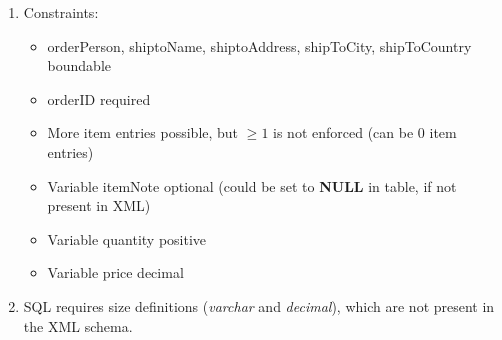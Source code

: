 \documentclass{scrartcl}
\begin{document}
\begin{enumerate}
		\item
		Constraints:
		\begin{itemize}
			\item orderPerson, shiptoName, shiptoAddress, shipToCity, shipToCountry boundable \checkmark
			\item orderID required \checkmark
			\item More item entries possible, but $\geq1$ is not enforced (can be 0 item entries) \lightning
			\item Variable itemNote optional (could be set to \textbf{NULL} in table, if not present in XML) \checkmark
			\item Variable quantity positive \checkmark
			\item Variable price decimal \checkmark
		\end{itemize}
		
		\item
		SQL requires size definitions (\textit{varchar} and \textit{decimal}), which are not present in the XML schema.
		
	\end{enumerate}
\end{document}
